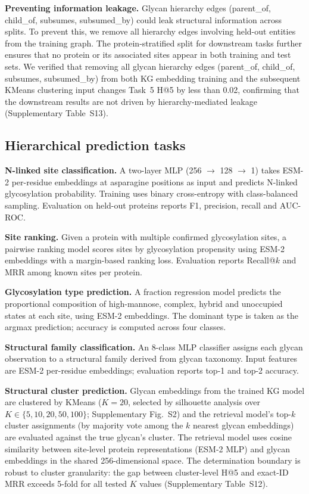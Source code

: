 \documentclass[11pt,a4paper]{article}
\begin{document}
\textbf{Preventing information leakage.} Glycan hierarchy edges (parent\_of,
child\_of, subsumes, subsumed\_by) could leak structural information across
splits. To prevent this, we remove all hierarchy edges involving held-out
entities from the training graph. The protein-stratified split for downstream
tasks further ensures that no protein or its associated sites appear in both
training and test sets. We verified that removing all glycan hierarchy edges (parent\_of, child\_of,
subsumes, subsumed\_by) from both KG embedding training and the subsequent
KMeans clustering input changes Task~5 H@5 by less than 0.02, confirming
that the downstream results are not driven by hierarchy-mediated leakage
(Supplementary Table~S13).

\subsection{Hierarchical prediction tasks}

\textbf{N-linked site classification.} A two-layer MLP (256 $\to$ 128 $\to$ 1)
takes ESM-2 per-residue embeddings at asparagine positions as input and predicts
N-linked glycosylation probability. Training uses binary cross-entropy with
class-balanced sampling. Evaluation on held-out proteins reports F1, precision,
recall and AUC-ROC.

\textbf{Site ranking.} Given a protein with multiple confirmed glycosylation
sites, a pairwise ranking model scores sites by glycosylation propensity using
ESM-2 embeddings with a margin-based ranking loss. Evaluation reports Recall@$k$
and MRR among known sites per protein.

\textbf{Glycosylation type prediction.} A fraction regression model predicts the
proportional composition of high-mannose, complex, hybrid and unoccupied states
at each site, using ESM-2 embeddings. The dominant type is taken as the argmax
prediction; accuracy is computed across four classes.

\textbf{Structural family classification.} An 8-class MLP classifier assigns
each glycan observation to a structural family derived from glycan taxonomy.
Input features are ESM-2 per-residue embeddings; evaluation reports top-1 and
top-2 accuracy.

\textbf{Structural cluster prediction.} Glycan embeddings from the trained KG
model are clustered by KMeans ($K = 20$, selected by silhouette analysis over
$K \in \{5, 10, 20, 50, 100\}$; Supplementary Fig.~S2) and the retrieval model's
top-$k$ cluster assignments (by majority vote among the $k$ nearest glycan
embeddings) are evaluated against the true glycan's cluster. The retrieval model
uses cosine similarity between site-level protein representations (ESM-2 MLP) and
glycan embeddings in the shared 256-dimensional space. The determination boundary
is robust to cluster granularity: the gap between cluster-level H@5 and exact-ID
MRR exceeds 5-fold for all tested $K$ values (Supplementary Table~S12).
\end{document}
